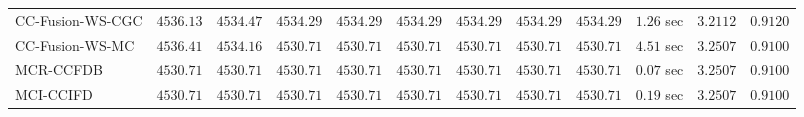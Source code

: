\begin{table}[H]
\begin{tabular}{lrrrrrrrrrrr}
    CC-Fusion-WS-CGC & $      4536.13$ & $      4534.47$ & $      4534.29$ & $      4534.29$ & $      4534.29$ & $      4534.29$ & $      4534.29$ & $      4534.29$ & $         1.26$ sec    & $       3.2112$  & $       0.9120$ \\ 
     CC-Fusion-WS-MC & $      4536.41$ & $      4534.16$ & $      4530.71$ & $      4530.71$ & $      4530.71$ & $      4530.71$ & $      4530.71$ & $      4530.71$ & $         4.51$ sec    & $       3.2507$  & $       0.9100$ \\ 
\cmidrule{1-1} 
           MCR-CCFDB & $      4530.71$ & $      4530.71$ & $      4530.71$ & $      4530.71$ & $      4530.71$ & $      4530.71$ & $      4530.71$ & $      4530.71$ & $         0.07$ sec    & $       3.2507$  & $       0.9100$ \\ 
\cmidrule{1-1} 
           MCI-CCIFD & $      4530.71$ & $      4530.71$ & $      4530.71$ & $      4530.71$ & $      4530.71$ & $      4530.71$ & $      4530.71$ & $      4530.71$ & $         0.19$ sec    & $       3.2507$  & $       0.9100$ \\ 
\bottomrule
\end{tabular}
\end{table}

